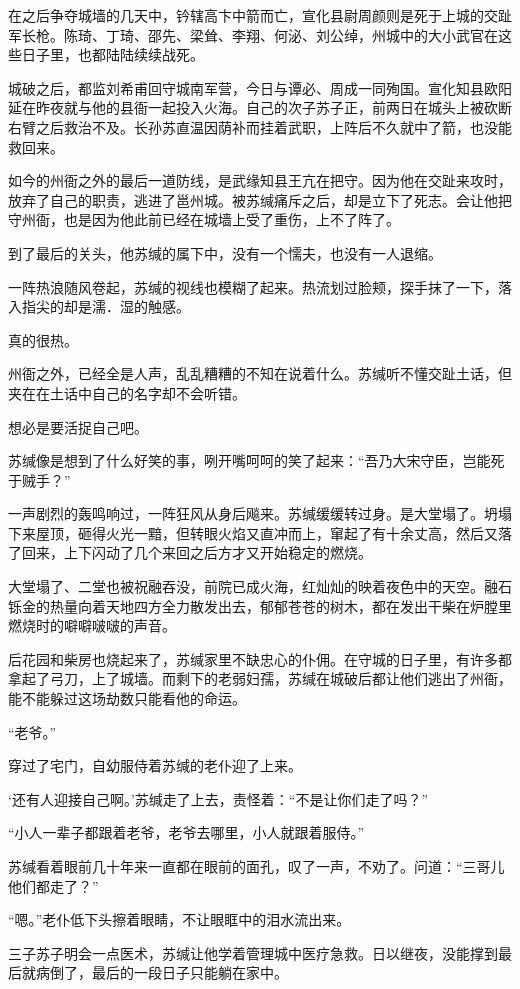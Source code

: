 在之后争夺城墙的几天中，钤辖高卞中箭而亡，宣化县尉周颜则是死于上城的交趾军长枪。陈琦、丁琦、邵先、梁耸、李翔、何泌、刘公绰，州城中的大小武官在这些日子里，也都陆陆续续战死。

城破之后，都监刘希甫回守城南军营，今日与谭必、周成一同殉国。宣化知县欧阳延在昨夜就与他的县衙一起投入火海。自己的次子苏子正，前两日在城头上被砍断右臂之后救治不及。长孙苏直温因荫补而挂着武职，上阵后不久就中了箭，也没能救回来。

如今的州衙之外的最后一道防线，是武缘知县王亢在把守。因为他在交趾来攻时，放弃了自己的职责，逃进了邕州城。被苏缄痛斥之后，却是立下了死志。会让他把守州衙，也是因为他此前已经在城墙上受了重伤，上不了阵了。

到了最后的关头，他苏缄的属下中，没有一个懦夫，也没有一人退缩。

一阵热浪随风卷起，苏缄的视线也模糊了起来。热流划过脸颊，探手抹了一下，落入指尖的却是濡．湿的触感。

真的很热。

州衙之外，已经全是人声，乱乱糟糟的不知在说着什么。苏缄听不懂交趾土话，但夹在在土话中自己的名字却不会听错。

想必是要活捉自己吧。

苏缄像是想到了什么好笑的事，咧开嘴呵呵的笑了起来：“吾乃大宋守臣，岂能死于贼手？”

一声剧烈的轰鸣响过，一阵狂风从身后飚来。苏缄缓缓转过身。是大堂塌了。坍塌下来屋顶，砸得火光一黯，但转眼火焰又直冲而上，窜起了有十余丈高，然后又落了回来，上下闪动了几个来回之后方才又开始稳定的燃烧。

大堂塌了、二堂也被祝融吞没，前院已成火海，红灿灿的映着夜色中的天空。融石铄金的热量向着天地四方全力散发出去，郁郁苍苍的树木，都在发出干柴在炉膛里燃烧时的噼噼啵啵的声音。

后花园和柴房也烧起来了，苏缄家里不缺忠心的仆佣。在守城的日子里，有许多都拿起了弓刀，上了城墙。而剩下的老弱妇孺，苏缄在城破后都让他们逃出了州衙，能不能躲过这场劫数只能看他的命运。

“老爷。”

穿过了宅门，自幼服侍着苏缄的老仆迎了上来。

‘还有人迎接自己啊。’苏缄走了上去，责怪着：“不是让你们走了吗？”

“小人一辈子都跟着老爷，老爷去哪里，小人就跟着服侍。”

苏缄看着眼前几十年来一直都在眼前的面孔，叹了一声，不劝了。问道：“三哥儿他们都走了？”

“嗯。”老仆低下头擦着眼睛，不让眼眶中的泪水流出来。

三子苏子明会一点医术，苏缄让他学着管理城中医疗急救。日以继夜，没能撑到最后就病倒了，最后的一段日子只能躺在家中。

